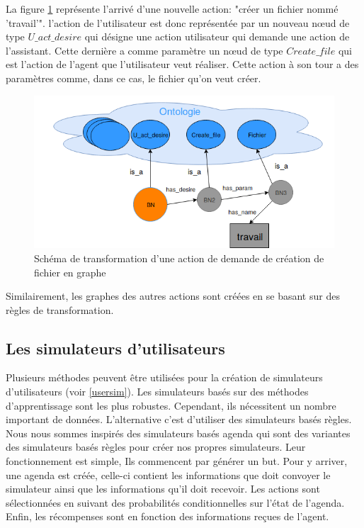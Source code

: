 La figure \ref{nonabstract_onto} représente l'arrivé d'une nouvelle action: "créer un fichier nommé 'travail'". l'action de l'utilisateur est donc représentée par un nouveau n\oe{}ud de type $U\_act\_desire$ qui désigne une action utilisateur qui demande une action de l'assistant. Cette dernière a comme paramètre un n\oe{}ud de type $Create\_file$ qui est l'action de l'agent que l'utilisateur veut réaliser. Cette action à son tour a des paramètres comme, dans ce cas, le fichier qu'on veut créer.
\begin{figure}[H] 
	\centering
	\includegraphics[width=0.88\linewidth]{images/Conception/DM/nonabstract_onto.png}
	\caption{Schéma de transformation d'une action de demande de création de fichier en graphe}\label{nonabstract_onto}
	
\end{figure}
Similairement, les graphes des autres actions sont créées en se basant sur des règles de transformation.
\subsection{Les simulateurs d'utilisateurs}
Plusieurs méthodes peuvent être utilisées pour la création de simulateurs d'utilisateurs (voir \ref{usersim}). Les simulateurs basés sur des méthodes d'apprentissage sont les plus robustes. Cependant, ils nécessitent un nombre important de données. L'alternative c'est d'utiliser des simulateurs basés règles. Nous nous sommes inspirés des simulateurs basés agenda\cite{Schatzmann2007} qui sont des variantes des simulateurs basés règles pour créer nos propres simulateurs. Leur fonctionnement est simple, Ils commencent par générer un but. Pour y arriver, une agenda est créée, celle-ci contient les informations que doit convoyer le simulateur ainsi que les informations qu'il doit recevoir. Les actions sont sélectionnées en suivant des probabilités conditionnelles sur l'état de l'agenda. Enfin, les récompenses sont en fonction des informations reçues de l'agent.
